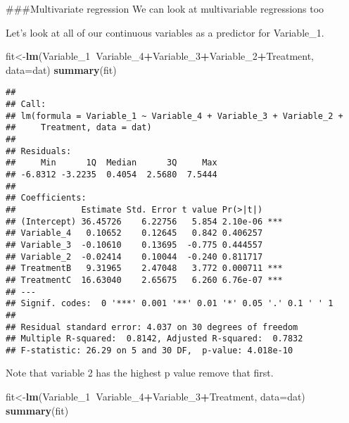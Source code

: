 \documentclass[
]{article}
\newenvironment{Shaded}{\begin{snugshade}}{\end{snugshade}}
\newcommand{\DataTypeTok}[1]{\textcolor[rgb]{0.13,0.29,0.53}{#1}}
\newcommand{\DecValTok}[1]{\textcolor[rgb]{0.00,0.00,0.81}{#1}}
\newcommand{\KeywordTok}[1]{\textcolor[rgb]{0.13,0.29,0.53}{\textbf{#1}}}
\newcommand{\NormalTok}[1]{#1}
\newcommand{\OperatorTok}[1]{\textcolor[rgb]{0.81,0.36,0.00}{\textbf{#1}}}
\begin{document}
\#\#\#Multivariate regression We can look at multivariable regressions
too

Let's look at all of our continuous variables as a predictor for
Variable\_1.

\begin{Shaded}
\begin{Highlighting}[]
\NormalTok{fit<-}\KeywordTok{lm}\NormalTok{(Variable_}\DecValTok{1}\OperatorTok{~}\NormalTok{Variable_}\DecValTok{4}\OperatorTok{+}\NormalTok{Variable_}\DecValTok{3}\OperatorTok{+}\NormalTok{Variable_}\DecValTok{2}\OperatorTok{+}\NormalTok{Treatment, }\DataTypeTok{data=}\NormalTok{dat)}
\KeywordTok{summary}\NormalTok{(fit)}
\end{Highlighting}
\end{Shaded}

\begin{verbatim}
## 
## Call:
## lm(formula = Variable_1 ~ Variable_4 + Variable_3 + Variable_2 + 
##     Treatment, data = dat)
## 
## Residuals:
##     Min      1Q  Median      3Q     Max 
## -6.8312 -3.2235  0.4054  2.5680  7.5444 
## 
## Coefficients:
##             Estimate Std. Error t value Pr(>|t|)    
## (Intercept) 36.45726    6.22756   5.854 2.10e-06 ***
## Variable_4   0.10652    0.12645   0.842 0.406257    
## Variable_3  -0.10610    0.13695  -0.775 0.444557    
## Variable_2  -0.02414    0.10044  -0.240 0.811717    
## TreatmentB   9.31965    2.47048   3.772 0.000711 ***
## TreatmentC  16.63040    2.65675   6.260 6.76e-07 ***
## ---
## Signif. codes:  0 '***' 0.001 '**' 0.01 '*' 0.05 '.' 0.1 ' ' 1
## 
## Residual standard error: 4.037 on 30 degrees of freedom
## Multiple R-squared:  0.8142, Adjusted R-squared:  0.7832 
## F-statistic: 26.29 on 5 and 30 DF,  p-value: 4.018e-10
\end{verbatim}

Note that variable 2 has the highest p value remove that first.

\begin{Shaded}
\begin{Highlighting}[]
\NormalTok{fit<-}\KeywordTok{lm}\NormalTok{(Variable_}\DecValTok{1}\OperatorTok{~}\NormalTok{Variable_}\DecValTok{4}\OperatorTok{+}\NormalTok{Variable_}\DecValTok{3}\OperatorTok{+}\NormalTok{Treatment, }\DataTypeTok{data=}\NormalTok{dat)}
\KeywordTok{summary}\NormalTok{(fit)}
\end{Highlighting}
\end{Shaded}
\end{document}
